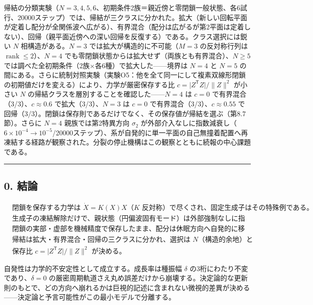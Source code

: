 \documentclass[
  a4paper,
]{ltjsarticle}
\begin{document}
帰結の分類実験（\(N=3,4,5,6\)、初期条件2族＝親近傍と零閉鎖一般状態、各6試行、20000ステップ）では、帰結が三クラスに分かれた。拡大（新しい回転平面が定着し配分が全関係波へ広がる）、有界混合（配分は広がるが第2平面は定着しない）、回帰（親平面近傍への深い回帰を反復する）である。クラス選択には鋭い
\(N\) 相構造がある。\(N=3\) では拡大が構造的に不可能（\(M=3\)
の反対称行列は \(\operatorname{rank}\le2\)）、\(N=4\)
でも零閉鎖状態からは拡大せず（両族とも有界混合）、\(N\ge5\)
では調べた全初期条件（2族×各6種）で拡大した------境界は \(N=4\) と
\(N=5\)
の間にある。さらに統制対照実験（実験O5：他を全て同一にして複素双線形閉鎖の初期値だけを変える）により、力学が厳密保存する比
\(c=\lvert Z^{\mathsf T}Z\rvert/\lVert Z\rVert^2\) が小さい \(N\)
の帰結クラスを層別することを確認した------\(N=4\) は \(c=0\)
で有界混合（3/3）、\(c\approx0.6\) で拡大（3/3）、\(N=3\) は \(c=0\)
で有界混合（3/3）、\(c\approx0.55\)
で回帰（3/3）。閉鎖は保存則であるだけでなく、その保存値が帰結を選ぶ（第8.7節）。さらに
\(N=4\) 親族では第2特異方向 \(\sigma_2\)
が外部介入なしに指数減衰し（\(6\times10^{-4}\to10^{-5}\)/20000ステップ）、系が自発的に単一平面の自己無撞着配置へ再凍結する経路が観察された。分裂の停止機構はこの観察とともに続報の中心課題である。

\begin{center}\rule{0.5\linewidth}{0.5pt}\end{center}

\subsection{0. 結論}\label{ux7d50ux8ad6}

\[
\boxed{
\begin{aligned}
&\text{閉鎖を保存する力学は }\dot X=K(X)X\text{（}K\text{ 反対称）で尽くされ、固定生成子はその特殊例である。}\\
&\text{生成子の凍結解除だけで、親状態（円偏波固有モード）は外部強制なしに指数的に崩れ、}\\
&\text{閉鎖の実部・虚部を機械精度で保存したまま、配分は休眠方向へ自発的に移動する。}\\
&\text{帰結は拡大・有界混合・回帰の三クラスに分かれ、選択は }N\text{（構造的余地）と}\\
&\text{保存比 }c=\lvert Z^{\mathsf T}Z\rvert/\lVert Z\rVert^2\text{ が決める。}
\end{aligned}
}
\]

自発性は力学的不安定性として成立する。成長率は種振幅 \(\delta\)
の3桁にわたり不変であり、\(\delta=0\)
の厳密周期軌道さえ丸め誤差だけから崩壊する。決定論的な更新則のもとで、どの方向へ崩れるかは巨視的記述に含まれない微視的差異が決める------決定論と予言可能性がこの最小モデルで分離する。
\end{document}

